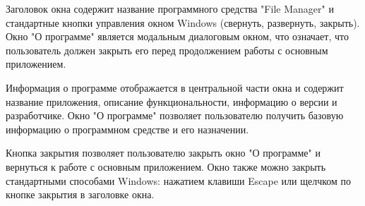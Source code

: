Заголовок окна содержит название программного средства "File Manager" и стандартные кнопки управления окном Windows (свернуть, развернуть, закрыть). Окно "О программе" является модальным диалоговым окном, что означает, что пользователь должен закрыть его перед продолжением работы с основным приложением.

Информация о программе отображается в центральной части окна и содержит название приложения, описание функциональности, информацию о версии и разработчике. Окно "О программе" позволяет пользователю получить базовую информацию о программном средстве и его назначении.

Кнопка закрытия позволяет пользователю закрыть окно "О программе" и вернуться к работе с основным приложением. Окно также можно закрыть стандартными способами Windows: нажатием клавиши Escape или щелчком по кнопке закрытия в заголовке окна.